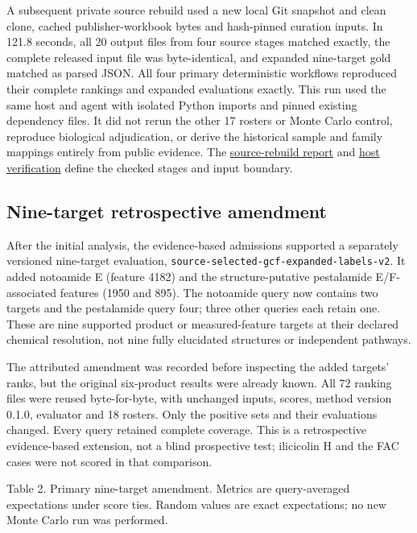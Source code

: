 \documentclass[
  10pt,
  a4paper,
]{article}
\begin{document}
A subsequent private source rebuild used a new local Git snapshot and clean clone, cached publisher-workbook bytes and hash-pinned curation inputs. In 121.8 seconds, all 20 output files from four source stages matched exactly, the complete released input file was byte-identical, and expanded nine-target gold matched as parsed JSON. All four primary deterministic workflows reproduced their complete rankings and expanded evaluations exactly. This run used the same host and agent with isolated Python imports and pinned existing dependency files. It did not rerun the other 17 rosters or Monte Carlo control, reproduce biological adjudication, or derive the historical sample and family mappings entirely from public evidence. The \href{https://github.com/vinvomero/fungallink-benchmark/blob/main/docs/release/clean-source-reproduction-2026-10-07.md}{source-rebuild report} and \href{https://github.com/vinvomero/fungallink-benchmark/blob/main/data/processed/clean-source-reproduction-2026-10-07/host-verification.json}{host verification} define the checked stages and input boundary.

\subsection{Nine-target retrospective amendment}\label{nine-target-retrospective-amendment}

After the initial analysis, the evidence-based admissions supported a separately versioned nine-target evaluation, \nolinkurl{source-selected-gcf-expanded-labels-v2}. It added notoamide E (feature 4182) and the structure-putative pestalamide E/F-associated features (1950 and 895). The notoamide query now contains two targets and the pestalamide query four; three other queries each retain one. These are nine supported product or measured-feature targets at their declared chemical resolution, not nine fully elucidated structures or independent pathways.

The attributed amendment was recorded before inspecting the added targets' ranks, but the original six-product results were already known. All 72 ranking files were reused byte-for-byte, with unchanged inputs, scores, method version 0.1.0, evaluator and 18 rosters. Only the positive sets and their evaluations changed. Every query retained complete coverage. This is a retrospective evidence-based extension, not a blind prospective test; ilicicolin H and the FAC cases were not scored in that comparison.

Table 2. Primary nine-target amendment. Metrics are query-averaged expectations under score ties. Random values are exact expectations; no new Monte Carlo run was performed.
\end{document}
